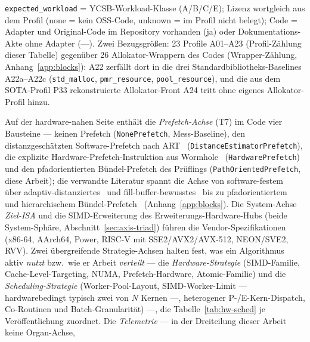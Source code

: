 \begin{table}[!htbp]
  \smallskip
  {\footnotesize \texttt{expected\_workload} = YCSB-Workload-Klasse (A/B/C/E); Lizenz wortgleich aus dem Profil
  (none = kein OSS-Code, unknown = im Profil nicht belegt); Code = Adapter und Original-Code im Repository
  vorhanden (ja) oder Dokumentations-Akte ohne Adapter (---). Zwei Bezugsgrößen: 23 Profile A01--A23
  (Profil-Zählung dieser Tabelle) gegenüber 26 Allokator-Wrappern des Codes (Wrapper-Zählung,
  Anhang~\ref{app:blocks}): A22 zerfällt dort in die drei Standardbibliotheks-Baselines A22a--A22c
  (\texttt{std\_malloc}, \texttt{pmr\_resource}, \texttt{pool\_resource}), und die aus dem SOTA-Profil P33
  rekonstruierte Allokator-Front A24 tritt ohne eigenes Allokator-Profil hinzu.\par}
\end{table}

\begin{nurlang}
Auf der hardware-nahen Seite enthält die \emph{Prefetch-Achse} (T7) im Code vier Bausteine --- keinen
Prefetch (\texttt{None\allowbreak{}Prefetch}, Mess-Baseline), den distanzgeschätzten Software-Prefetch nach
ART~\cite{leis2013art} (\texttt{Distance\allowbreak{}Estimator\allowbreak{}Prefetch}), die explizite
Hardware-Prefetch-Instruktion aus Wormhole~\cite{wu2019wormhole} (\texttt{Hardware\allowbreak{}Prefetch}) und
den pfadorientierten Bündel-Prefetch des Prüflings (\texttt{Path\allowbreak{}Oriented\allowbreak{}Prefetch},
diese Arbeit); die verwandte Literatur spannt die Achse von software-festem~\cite{chen2001prefetch} über
adaptiv-distanziertes~\cite{khan2010adaptive} und fill-buffer-bewusstes~\cite{mahling2025hotpath} bis zu
pfadorientiertem~\cite{zhang2024pathprefix} und hierarchischem Bündel-Prefetch~\cite{zhang2025hierarchical}
(Anhang~\ref{app:blocks}). Die System-Achse \emph{Ziel-ISA} und die SIMD-Erweiterung
des Erweiterungs-Hardware-Hubs (beide System-Sphäre, Abschnitt~\ref{sec:axis-triad}) führen
die Vendor-Spezifikationen (x86-64, AArch64, Power, RISC-V mit SSE2/AVX2/AVX-512, NEON/SVE2, RVV). Zwei
übergreifende Strategie-Achsen halten fest, was ein Algorithmus aktiv \emph{nutzt} bzw.\ wie er Arbeit
\emph{verteilt} --- die \emph{Hardware-Strategie} (SIMD-Familie, Cache-Level-Targeting, NUMA,
Prefetch-Hardware, Atomic-Familie) und die \emph{Scheduling-Strategie} (Worker-Pool-Layout,
SIMD-Worker-Limit --- hardwarebedingt typisch zwei von $N$ Kernen ---, heterogener P-/E-Kern-Dispatch,
Co-Routinen und Batch-Granularität) ---, die Tabelle~\ref{tab:hw-sched}
je Veröffentlichung zuordnet. Die \emph{Telemetrie} --- in der Dreiteilung dieser Arbeit keine Organ-Achse,

\end{nurlang}
